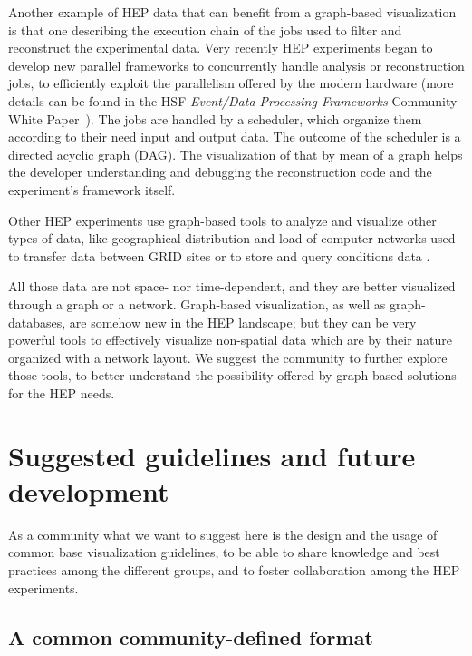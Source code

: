 \documentclass[12pt,a4paper]{article}
\begin{document}
Another example of HEP data that can benefit from a graph-based visualization is that one describing the execution chain of the jobs
used to filter and reconstruct the experimental data. Very recently HEP experiments began to develop new parallel frameworks
to concurrently handle analysis or reconstruction jobs, to efficiently exploit the parallelism offered by the modern hardware
(more details can be found in the HSF \textit{Event/Data Processing Frameworks} Community White Paper~\cite{HSF-CWP-2017-08}).
The jobs are handled by a scheduler, which organize them according to their need input and output data. The outcome of the scheduler
is a directed acyclic graph (DAG). The visualization of that by mean of a graph helps the developer understanding and debugging the
reconstruction code and the experiment’s framework itself.

Other HEP experiments use graph-based tools to analyze and visualize other types of data, like geographical distribution and load of computer
networks used to transfer data between GRID sites \cite{???} %
 or to store and query conditions data \cite{Clemencic:2012cw}.

All those data are not space- nor time-dependent, and they are better visualized through a graph or a network. Graph-based visualization,
as well as graph-databases, are somehow new in the HEP landscape; but they can be very powerful tools to effectively visualize
non-spatial data which are by their nature organized with a network layout. We suggest the community to further explore those tools,
to better understand the possibility offered by graph-based solutions for the HEP needs.



\hypertarget{suggested-guidelines}{%
\section{Suggested guidelines and future development}\label{suggested-guidelines}}

As a community what we want to suggest here is the design and the usage of common base visualization guidelines,
to be able to share knowledge and best practices among the different groups, and to foster collaboration among the HEP experiments.

\hypertarget{common-format}{%
\subsection{A common community-defined format}\label{common-format}}
\end{document}
